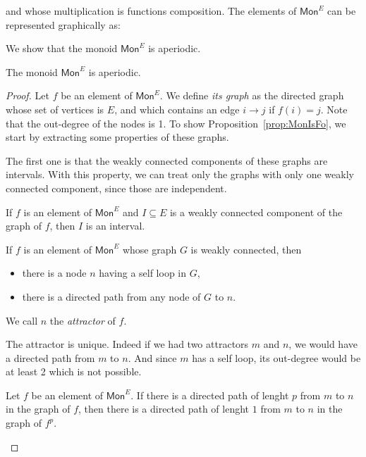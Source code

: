 and whose multiplication is functions composition.  The elements of $\mathsf{Mon}^E$ can be represented graphically as:
     

We show that the monoid $\mathsf{Mon}^E$ is aperiodic.
     \begin{proposition}\label{prop:MonIsFo}
The monoid $\mathsf{Mon}^E$ is aperiodic.     
     \end{proposition}
     
     \begin{proof}
     Let $f$ be an element of $\mathsf{Mon}^E$. We define \emph {its graph} as the directed graph whose set of vertices is $E$, and which contains an edge $i\rightarrow j$ if $f(i)=j$. Note that the out-degree of the nodes is 1. To show Proposition~\ref{prop:MonIsFo}, we start by extracting some properties of these graphs.
     
The first one is that the weakly connected components of these graphs are intervals. With this property, we can treat only the graphs with only one weakly connected component, since those are independent. 
     \begin{lemma}
     If $f$ is an element of $\mathsf{Mon}^E$ and $I\subseteq E$ is a weakly connected component of the graph of $f$, then $I$ is an interval. 
     \end{lemma}
     
     \begin{lemma}
     If $f$ is an element of $\mathsf{Mon}^E$ whose graph $G$ is weakly connected, then 
\begin{itemize}
\item there is a node $n$  having a self loop in $G$,
\item there is a directed path from any node of $G$ to $n$. 
\end{itemize}     
 We call $n$ the \emph{attractor} of $f$.    
     \end{lemma}  
     The attractor is unique. Indeed if we had two attractors $m$ and $n$, we would have a directed path from $m$ to $n$. And since $m$ has a self loop, its out-degree would be at least 2 which is not possible. 
      
    \begin{lemma}
    Let $f$ be an element of $\mathsf{Mon}^E$.  If there is a directed path of lenght $p$ from $m$ to $n$ in the graph of $f$, then there is a directed path of lenght $1$ from $m$ to $n$ in the graph of $f^p$.
    \end{lemma}
     \end{proof}